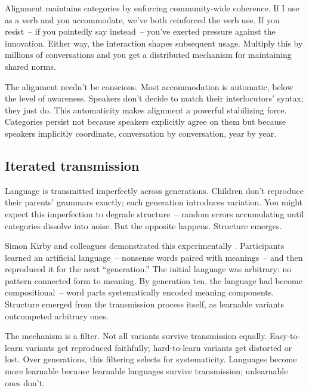 Alignment maintains categories by enforcing community-wide coherence. If I use  as a verb and you accommodate, we've both reinforced the verb use. If you resist~-- if you pointedly say  instead~-- you've exerted pressure against the innovation. Either way, the interaction shapes subsequent usage. Multiply this by millions of conversations and you get a distributed mechanism for maintaining shared norms.

The alignment needn't be conscious. Most accommodation is automatic, below the level of awareness. Speakers don't decide to match their interlocutors' syntax; they just do. This automaticity makes alignment a powerful stabilizing force. Categories persist not because speakers explicitly agree on them but because speakers implicitly coordinate, conversation by conversation, year by year.

\subsection{Iterated transmission}
\label{subsec:4:transmission}

Language is transmitted imperfectly across generations. Children don't reproduce their parents' grammars exactly; each generation introduces variation. You might expect this imperfection to degrade structure~-- random errors accumulating until categories dissolve into noise. But the opposite happens. Structure emerges.

Simon Kirby and colleagues demonstrated this experimentally \citep{kirby2008,kirby2015compression}. Participants learned an artificial language~-- nonsense words paired with meanings~-- and then reproduced it for the next \enquote{generation.} The initial language was arbitrary: no pattern connected form to meaning. By generation ten, the language had become compositional~-- word parts systematically encoded meaning components. Structure emerged from the transmission process itself, as learnable variants outcompeted arbitrary ones.

The mechanism is a filter. Not all variants survive transmission equally. Easy-to-learn variants get reproduced faithfully; hard-to-learn variants get distorted or lost. Over generations, this filtering selects for systematicity. Languages become more learnable because learnable languages survive transmission; unlearnable ones don't.

